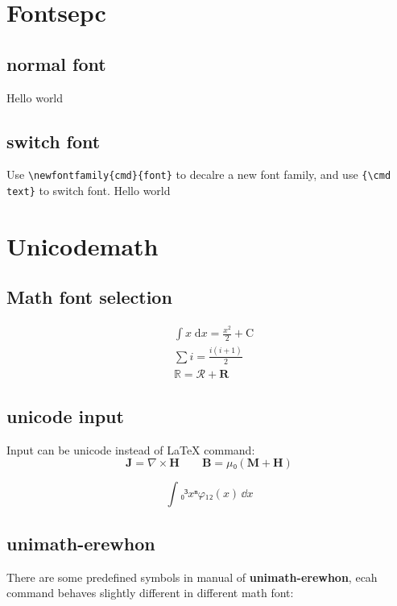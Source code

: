 \documentclass{article}
\begin{document}
\section{Fontsepc}
\subsection{normal font}
Hello world

\subsection{switch font}
Use \verb|\newfontfamily{cmd}{font}| to decalre a new font family, and use \verb|{\cmd text}| to switch font.
{\sourceCodePro Hello world}




\section{Unicodemath}
\subsection{Math font selection}
\begin{align}
  & \int x\; \mathrm{d}x = \frac{x^2}{2} + \mathrm{C}\\
  & \sum i = \frac{i(i+1)}{2}\\
  & \mathbb{R} = \mathcal{R} + \mathbf{R}
\end{align}


\subsection{unicode input}
Input can be unicode instead of \LaTeX{} command:
\[
    𝐉 = ∇×𝐇 \qquad 𝐁 = μ₀(𝐌 + 𝐇)
\]

\[
  ∫₀³ xⁿφ₁₂(x)\,ⅆx
\]

\subsection{unimath-erewhon}
There are some predefined symbols in manual of \textbf{unimath-erewhon}, ecah 
command behaves slightly different in different math font:
\end{document}
